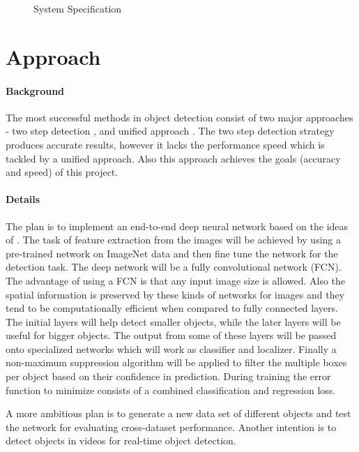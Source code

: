 \documentclass[12pt]{article}
\begin{document}
\begin{figure}[h]
\begin{subfigure}	[h]{0.4\textwidth}
		\end{subfigure}
		\caption{System Specification}
	\end{figure}
		
	\section*{Approach}
	\paragraph{Background}
	The most successful methods in object detection consist of two major approaches -  two step detection \cite{girshick14CVPR, girshickICCV15fastrcnn, renNIPS15fasterrcnn}, and unified approach \cite{Redmon_2016_CVPR, liu2016ssd}. The two step detection strategy produces accurate results, however it lacks the performance speed which is tackled by a unified approach. Also this approach achieves the goals (accuracy and speed) of this project. 
	
	\paragraph{Details}
	The plan is to implement  an end-to-end deep neural network based on the ideas of \cite{liu2016ssd}. The task of feature extraction from the images will be achieved by using a pre-trained network on ImageNet data	\cite{imagenet_cvpr09} and then fine tune the network for the detection task. The deep network will be a fully convolutional network (FCN). The advantage of using a FCN is that any input image size is allowed. Also the spatial information is preserved by these kinds of networks for images and they tend to be computationally efficient when compared to fully connected layers.  The initial layers will help detect smaller objects, while the later layers will be useful for bigger objects. The output from some of these layers will be passed onto specialized networks which will work as classifier and localizer. Finally a non-maximum suppression  algorithm will be applied to filter the multiple boxes per object based on their confidence in prediction.  During training the error function to minimize consists of a combined classification and regression loss. 
	
	A more ambitious plan is to generate a new data set of different objects  and test the network for evaluating cross-dataset performance. Another intention is to detect objects in videos for real-time object detection.
	
\end{document}
